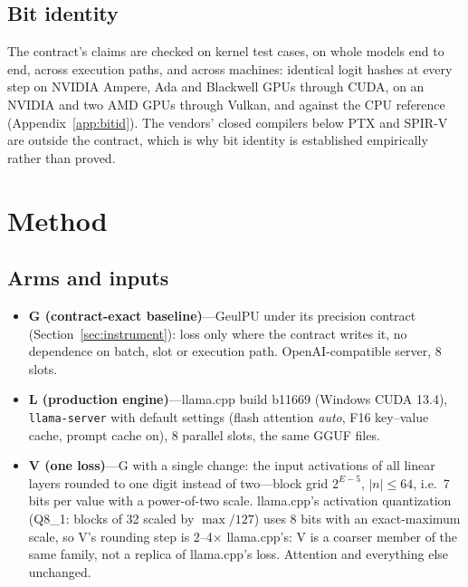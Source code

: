 \documentclass[11pt]{article}
\begin{document}
\subsection{Bit identity}\label{sec:bitid}

The contract's claims are checked on kernel test cases, on whole models end to end, across execution paths, and across
machines: identical logit hashes at every step on NVIDIA Ampere, Ada and Blackwell GPUs through CUDA, on an NVIDIA and two AMD
GPUs through Vulkan, and against the CPU reference (Appendix~\ref{app:bitid}). The vendors' closed compilers below PTX and
SPIR-V are outside the contract, which is why bit identity is established empirically rather than proved.

\section{Method}\label{sec:method}

\subsection{Arms and inputs}\label{sec:arms}

\begin{itemize}
\item \textbf{G (contract-exact baseline)}---GeulPU under its precision contract (Section~\ref{sec:instrument}): loss only
      where the contract writes it, no dependence on batch, slot or execution path. OpenAI-compatible server, 8 slots.
\item \textbf{L (production engine)}---llama.cpp build b11669 (Windows CUDA 13.4), \texttt{llama-server} with default
      settings (flash attention \emph{auto}, F16 key--value cache, prompt cache on), 8 parallel slots, the same GGUF files.
\item \textbf{V (one loss)}---G with a single change: the input activations of all linear layers rounded to one digit
      instead of two---block grid $2^{E-5}$, $|n|\le 64$, i.e.\ 7 bits per value with a power-of-two scale. llama.cpp's
      activation quantization (Q8\_1: blocks of 32 scaled by $\max/127$) uses 8 bits with an exact-maximum scale, so V's
      rounding step is 2--4$\times$ llama.cpp's: V is a coarser member of the same family, not a replica of llama.cpp's
      loss. Attention and everything else unchanged.
\end{itemize}
\end{document}
